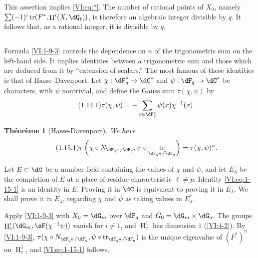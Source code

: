 \documentclass[oneside]{book}
\DeclareMathOperator{\h}{H}
\DeclareMathOperator{\tr}{tr}
\newcounter{char}
\theoremstyle{sga-source}
\theoremstyle{sga-source-dash}
\theoremstyle{sga-source-dotdash}
\theoremstyle{sga-source-number-note-dash}
\theoremstyle{sga-source-note-number-dotdash}
\theoremstyle{sga-source-example-dotdash}
\theoremstyle{sga-source-inline-number}
\theoremstyle{sga-source-bare-number}
\theoremstyle{sga-source}
\newtheorem{theorem_}[subsection]{Théorème}
\newcommand{\PrintPage}[1]{}\newcommand{\MathPage}[1]{}\newcommand{\PrintCite}[2]{#1}\newcommand{\var}[3]{#1}
\begin{document}
This assertion implies \eqref{VI:eq:*}. The number of rational points of 
$X_0$, namely $\var{\sum (-1)^i \tr(F^\ast,\h^i(X,\dQ_\ell))}{\sum (-1)^i \tr(F^\ast,\h_c^i(X,\dQ_\ell))}{S45-SOL-0697}$, is therefore an 
algebraic integer divisible by $q$. It follows that, as a rational integer, 
it is divisible by $q$. 





\PrintPage{177}
\subsection{}\label{VI:1-14}

Formula \ref{VI:1-9-3} controls the dependence on $n$ of the trigonometric 
sum on the left-hand side. It implies identities between a 
trigonometric sum and those which are deduced from it by ``extension of 
scalars.'' The most famous of these identities is that of 
Hasse--Davenport. Let $\chi:\dF_q^\ast \to \dC^\ast$ and 
$\psi:\dF_q\to \dC^\ast$ be characters, with $\psi$ nontrivial, and 
define the Gauss sum $\tau(\chi,\psi)$ by 
\begin{equation*}\tag{1.14.1}\label{VI:eq:1-14-1}
  \tau(\chi,\psi) = - \sum_{x\in \dF_q^\ast} \psi(x) \chi^{-1}(x) \text{.}
\end{equation*}





\begin{theorem_}[Hasse-Davenport]\label{VI:1-15}
We have 
\begin{equation*}\tag{1.15.1}\label{VI:eq:1-15-1}
  \tau\left(\chi\circ N_{\dF_{q^n}/\dF_q},\psi\circ \tr_{\dF_{q^n}/\dF_q}\right) = \tau(\chi,\psi)^n \text{.}
\end{equation*}
\end{theorem_}

Let $E\subset \dC$ be a number field containing the values of $\chi$ and 
$\psi$, and let $E_\lambda$ be the completion of $E$ at a place of residue 
characteristic $\ell\ne p$. Identity \eqref{VI:eq:1-15-1} is an identity in 
$E$. Proving it in $\dC$ is equivalent to proving it in $E_\lambda$. We 
shall prove it in $E_\lambda$, regarding $\chi$ and $\psi$ as taking values 
in $E_\lambda^\ast$.

Apply \ref{VI:1-9-3} with $X_0=\dG_m$ over $\dF_q$ and 
$G_0=\dG_m\times \dG_a$. The groups $\h_c^i(\dG_m,\sF(\chi^{-1}\psi))$ vanish for 
$i\ne 1$, and $\h_c^1$ has dimension $1$ (\ref{VI:4-2}). By 
\ref{VI:1-9-3}, 
$\tau(\chi\circ N_{\dF_{q^n}/\dF_q},\psi\circ \tr_{\dF_{q^n}/\dF_q})$ is 
the unique eigenvalue of $(F^\ast)^n$ on $\h_c^1$, and \eqref{VI:eq:1-15-1} 
follows. 
\end{document}

